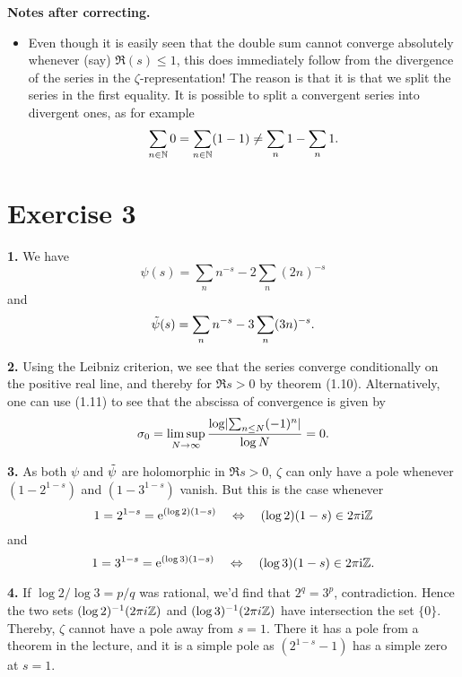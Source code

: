 \documentclass[a4paper,11pt]{article}
\begin{document}
\textbf{Notes after correcting.} \leavevmode
\begin{itemize}
    \item Even though it is easily seen that the double sum cannot converge
        absolutely whenever (say) $\Re(s) \leq 1$, this does immediately follow
        from the divergence of the series in the $\zeta$-representation! The reason is that
        it is that we split the series in the first equality. It is
        possible to split a convergent series into divergent ones, as for example
        \[
            \sum_{n \in \mathbb{N}} 0 = \sum_{n \in \mathbb{N}} (1-1) \neq \sum_n 1 - \sum_n 1.
        \]
\end{itemize}

\section*{Exercise 3}
\textbf{1.} We have
\[
    \psi(s) = \sum_{n} n^{-s} - 2 \sum_n (2n)^{-s}
\]
and 
\[
    \Tilde \psi(s) = \sum_{n} n^{-s} - 3 \sum_n (3n)^{-s}.
\]

\textbf{2.} Using the Leibniz criterion, we see that the series converge
conditionally on the positive real line, and thereby for $\Re s > 0$ by theorem
(1.10). Alternatively, one can use (1.11) to see that the abscissa of convergence is
given by 
\[
    \sigma_0 = \limsup_{N \to \infty} \frac{\log \lvert \sum_{n \leq N} (-1)^n \rvert}{\log N} = 0.
\]

\textbf{3.} As both $\psi$ and $\Tilde \psi$ are holomorphic in $\Re s > 0$, $\zeta$ can only
have a pole whenever $(1-2^{1-s})$ and $(1-3^{1-s})$ vanish. But this is the case whenever 
\[
    1 = 2^{1-s} = \mathrm e^{(\log 2)(1-s)} \quad \Leftrightarrow \quad (\log 2)(1-s) \in 
    2 \pi \mathrm i \mathbb{Z}
\]
and 
\[
    1 = 3^{1-s} = \mathrm e^{(\log 3)(1-s)} \quad \Leftrightarrow \quad (\log 3)(1-s) \in 
    2 \pi \mathrm i \mathbb{Z}.
\]

\textbf{4.} If $\log 2 / \log 3 = p/q$ was rational, we'd find that $2^q = 3^p$, contradiction.
Hence the two sets $(\log 2)^{-1} (2 \pi i \mathbb{Z})$ and $(\log 3)^{-1}( 2 \pi i \mathbb{Z})$ have intersection the set
$\{0\}$. Thereby, $\zeta$ cannot have a pole away from $s = 1$. There it has a pole from a 
theorem in the lecture, and it is a simple pole as $(2^{1-s}-1)$ has a simple zero at $s=1$. 
\end{document}
